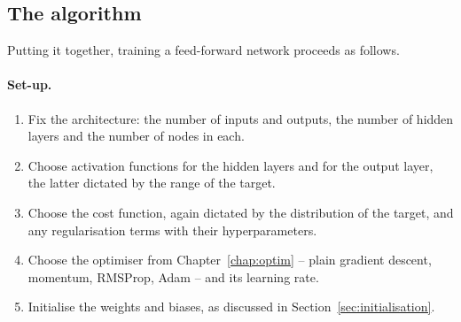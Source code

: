 \subsection{The algorithm}
\label{sec:backpropalgo}

Putting it together, training a feed-forward network proceeds as follows.

\paragraph{Set-up.}
\begin{enumerate}
  \item Fix the architecture: the number of inputs and outputs, the number of
        hidden layers and the number of nodes in each.
  \item Choose activation functions for the hidden layers and for the output
        layer, the latter dictated by the range of the target.
  \item Choose the cost function, again dictated by the distribution of the
        target, and any regularisation terms with their hyperparameters.
  \item Choose the optimiser from Chapter~\ref{chap:optim} -- plain gradient
        descent, momentum, RMSProp, Adam -- and its learning rate.
  \item Initialise the weights and biases, as discussed in
        Section~\ref{sec:initialisation}.
\end{enumerate}

